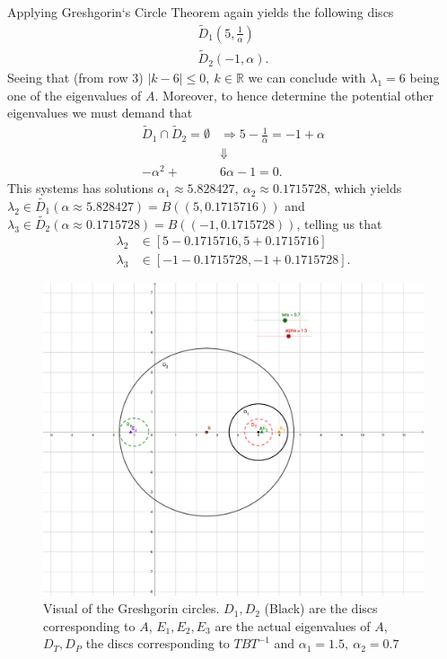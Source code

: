 \documentclass[12pt,
               a4paper,
               article,
               oneside,
               english,oldfontcommands]{memoir}
\begin{document}
Applying Greshgorin`s Circle Theorem again yields the following discs 
\begin{align}
\tilde{D}_{1}\left(5, \frac{1}{\alpha}\right) \\[5pt]
\tilde{D}_{2}\left( -1, \alpha \right).
\end{align}
Seeing that (from row 3) $|k - 6| \leq 0, \  k \in \mathbb{R}$ we can conclude with $\lambda_{1} = 6$ being one of the eigenvalues of $A$. Moreover, to hence determine the potential other eigenvalues we must demand that
\begin{align*}
\tilde{D}_{1} \cap \tilde{D}_{2} = \emptyset &\Rightarrow 5 - \frac{1}{\alpha} = -1 + \alpha\\[5pt]
&\Downarrow \\[5pt]
-\alpha^2 +&6 \alpha - 1 = 0.
\end{align*}
This systems has solutions $\alpha_{1} \approx 5.828427, \ \alpha_{2} \approx 0.1715728$, which yields $\lambda_{2} \in \tilde{D_{1}}(\alpha \approx 5.828427) = B((5, 0.1715716))$ and  $\lambda_{3} \in \tilde{D_{2}}(\alpha \approx 0.1715728) = B((-1,0.1715728))$, telling us that 
\begin{align*}
\lambda_2 &\in [5 - 0.1715716, 5 + 0.1715716] \\[5pt]
\lambda_3 &\in [-1- 0.1715728, -1 + 0.1715728].
\end{align*}
\begin{figure}[H]
\centering 
\includegraphics[width=1\textwidth]{exercise_1_b.pdf}
\caption{Visual of the Greshgorin circles. $D_1, D_2$ (Black) are the discs corresponding to $A$, $E_1, E_2, E_3$ are the actual eigenvalues of $A$, $D_T, D_P$ the discs corresponding to $TBT^{-1}$ and $\alpha_{1} = 1.5, \ \alpha_2 = 0.7$}
\end{figure}
\end{document}
